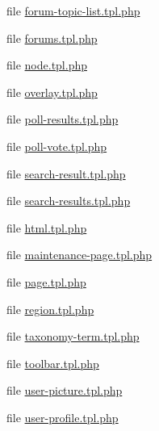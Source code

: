 \begin{DoxyCompactItemize}
\item 
file \hyperlink{forum-topic-list_8tpl_8php}{forum-\/topic-\/list.tpl.php}
\item 
file \hyperlink{forums_8tpl_8php}{forums.tpl.php}
\item 
file \hyperlink{modules_2node_2node_8tpl_8php}{node.tpl.php}
\item 
file \hyperlink{overlay_8tpl_8php}{overlay.tpl.php}
\item 
file \hyperlink{poll-results_8tpl_8php}{poll-\/results.tpl.php}
\item 
file \hyperlink{poll-vote_8tpl_8php}{poll-\/vote.tpl.php}
\item 
file \hyperlink{search-result_8tpl_8php}{search-\/result.tpl.php}
\item 
file \hyperlink{search-results_8tpl_8php}{search-\/results.tpl.php}
\item 
file \hyperlink{html_8tpl_8php}{html.tpl.php}
\item 
file \hyperlink{modules_2system_2maintenance-page_8tpl_8php}{maintenance-\/page.tpl.php}
\item 
file \hyperlink{modules_2system_2page_8tpl_8php}{page.tpl.php}
\item 
file \hyperlink{region_8tpl_8php}{region.tpl.php}
\item 
file \hyperlink{taxonomy-term_8tpl_8php}{taxonomy-\/term.tpl.php}
\item 
file \hyperlink{toolbar_8tpl_8php}{toolbar.tpl.php}
\item 
file \hyperlink{user-picture_8tpl_8php}{user-\/picture.tpl.php}
\item 
file \hyperlink{user-profile_8tpl_8php}{user-\/profile.tpl.php}
\end{DoxyCompactItemize}
